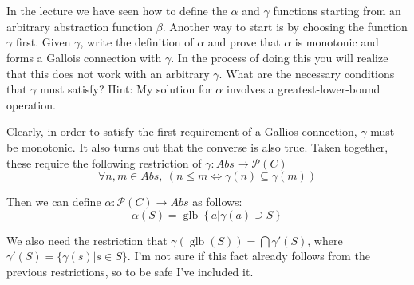 \documentclass{article}
\newcommand{\problem}[1]
{\subsubsection*{} %
\vspace{-16pt} \section{} \vspace{-22pt} \qquad
#1%
\bigskip \bigskip
}
\newcommand{\powerset}{\mathcal{P}}
\newcommand{\glb}{\operatorname{glb}}
\begin{document}
\problem{In the lecture we have seen how to define the $\alpha$ and $\gamma$
functions starting from an arbitrary abstraction function $\beta$. Another way to
start is by choosing the function $\gamma$ first. Given $\gamma$, write the
definition of $\alpha$ and prove that $\alpha$ is monotonic and forms a Gallois
connection with $\gamma$. In the process of doing this you will realize that this
does not work with an arbitrary $\gamma$. What are the necessary conditions that
$\gamma$ must satisfy? Hint: My solution for $\alpha$ involves a
greatest-lower-bound operation.
}

Clearly, in order to satisfy the first requirement of a Gallios connection,
$\gamma$ must be monotonic.  It also turns out that the converse is also true. 
Taken together, these require the following restriction of
$\gamma : Abs \to \powerset(C)$
\[
\forall n, m \in Abs,\ \left( n \le m \iff \gamma(n) \subseteq \gamma(m) \right)
\]

Then we can define $\alpha : \powerset(C) \to Abs$ as follows:
\[
\alpha(S) =  \glb \left\{ a | \gamma(a) \supseteq S \right\}
\]

We also need the restriction that $\gamma(\glb(S)) = \bigcap \gamma'(S)$, where
$\gamma'(S) = \{ \gamma(s) | s \in S \}$.  I'm not sure if this fact already
follows from the previous restrictions, so to be safe I've included it.

\bigskip
\end{document}
